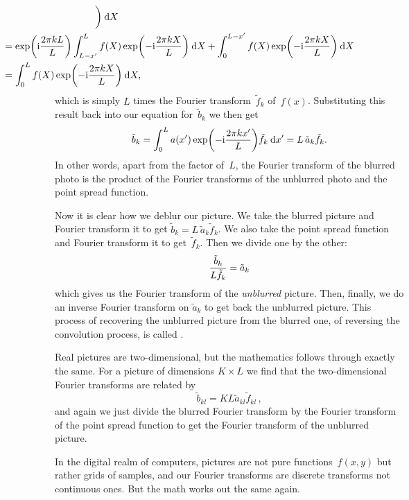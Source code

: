 \documentclass[12pt]{article}
\begin{document}
\begin{exercises}
\begin{align*}
   \biggr) \>\dd X \\
&\hspace{-12em} {} = \exp\biggl( \ii {2\pi k L\over L} \biggr)
   \int_{L-x'}^L f(X) \exp\biggl( -\ii {2\pi k X\over L} \biggr) \>\dd X
   + \int_0^{L-x'} f(X) \exp\biggl( -\ii {2\pi k X\over L} \biggr) \>\dd X
   \\
&\hspace{-12em} {} = \int_0^L f(X)
                    \exp\biggl( -\ii {2\pi k X\over L} \biggr) \>\dd X,
\end{align*}
which is simply $L$ times the Fourier transform~$\tilde{f}_k$ of~$f(x)$.
Substituting this result back into our equation for~$\tilde{b}_k$ we then
get
\begin{displaymath}
\tilde{b}_k = \int_0^L a(x')
              \exp\biggl( -\mathrm{i} {2\pi k x'\over L} \biggr)
              \tilde{f}_k \>\mathrm{d} x'
            = L\,\tilde{a}_k\tilde{f}_k.
\end{displaymath}
In other words, apart from the factor of~$L$, the Fourier transform of the
blurred photo is the product of the Fourier transforms of the unblurred
photo and the point spread function.

Now it is clear how we deblur our picture.  We take the blurred
picture and Fourier transform it to get $\tilde{b}_k =
L\,\tilde{a}_k\tilde{f}_k$.  We also take the point spread function and
Fourier transform it to get~$\tilde{f}_k$.  Then we divide one by the
other:
\begin{displaymath}
{\tilde{b}_k\over L\tilde{f}_k} = \tilde{a}_k
\end{displaymath}
which gives us the Fourier transform of the \emph{unblurred} picture.
Then, finally, we do an inverse Fourier transform on $\tilde{a}_k$ to get
back the unblurred picture.  This process of recovering the unblurred
picture from the blurred one, of reversing the convolution process, is
called .

Real pictures are two-dimensional, but the mathematics follows through
exactly the same.  For a picture of dimensions $K\times L$ we find that the
two-dimensional Fourier transforms are related by
\begin{displaymath}
\tilde{b}_{kl} =  KL\tilde{a}_{kl}\tilde{f}_{kl}\,,
\end{displaymath}
and again we just divide the blurred Fourier transform by the Fourier
transform of the point spread function to get the Fourier transform of the
unblurred picture.

In the digital realm of computers, pictures are not pure functions~$f(x,y)$
but rather grids of samples, and our Fourier transforms are discrete
transforms not continuous ones.  But the math works out the same again.


\end{exercises}
\end{document}
